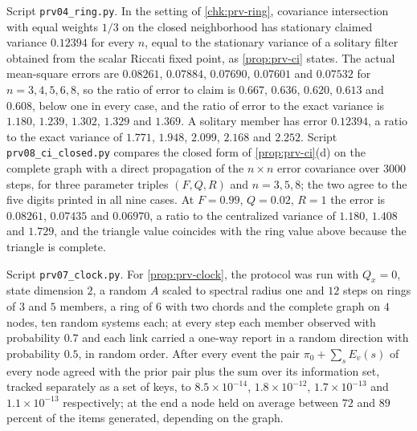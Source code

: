 \begin{numcheck}\label{chk:prv-ci}
Script \texttt{prv04\_ring.py}. In the setting of \cref{chk:prv-ring}, covariance intersection with equal weights $1/3$ on the closed neighborhood has stationary claimed variance $0.12394$ for every $n$, equal to the stationary variance of a solitary filter obtained from the scalar Riccati fixed point, as \cref{prop:prv-ci} states. The actual mean-square errors are $0.08261$, $0.07884$, $0.07690$, $0.07601$ and $0.07532$ for $n=3,4,5,6,8$, so the ratio of error to claim is $0.667$, $0.636$, $0.620$, $0.613$ and $0.608$, below one in every case, and the ratio of error to the exact variance is $1.180$, $1.239$, $1.302$, $1.329$ and $1.369$. A solitary member has error $0.12394$, a ratio to the exact variance of $1.771$, $1.948$, $2.099$, $2.168$ and $2.252$. Script \texttt{prv08\_ci\_closed.py} compares the closed form of \cref{prop:prv-ci}(d) on the complete graph with a direct propagation of the $n\times n$ error covariance over $3000$ steps, for three parameter triples $(F,Q,R)$ and $n=3,5,8$; the two agree to the five digits printed in all nine cases. At $F=0.99$, $Q=0.02$, $R=1$ the error is $0.08261$, $0.07435$ and $0.06970$, a ratio to the centralized variance of $1.180$, $1.408$ and $1.729$, and the triangle value coincides with the ring value above because the triangle is complete.
\end{numcheck}

\begin{numcheck}\label{chk:prv-clock}
Script \texttt{prv07\_clock.py}. For \cref{prop:prv-clock}, the protocol was run with $Q_x=0$, state dimension $2$, a random $A$ scaled to spectral radius one and $12$ steps on rings of $3$ and $5$ members, a ring of $6$ with two chords and the complete graph on $4$ nodes, ten random systems each; at every step each member observed with probability $0.7$ and each link carried a one-way report in a random direction with probability $0.5$, in random order. After every event the pair $\pi_0+\sum_sE_v(s)$ of every node agreed with the prior pair plus the sum over its information set, tracked separately as a set of keys, to $8.5\times10^{-14}$, $1.8\times10^{-12}$, $1.7\times10^{-13}$ and $1.1\times10^{-13}$ respectively; at the end a node held on average between $72$ and $89$ percent of the items generated, depending on the graph.
\end{numcheck}

